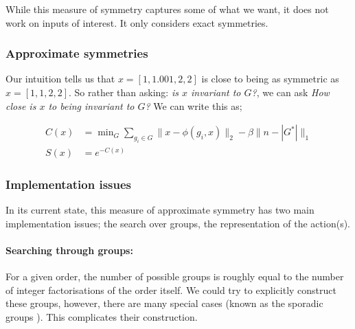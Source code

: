 While this measure of symmetry captures some of what we want, it does not work on inputs of interest.
It only considers exact symmetries.

\subsubsection{Approximate symmetries}

Our intuition tells us that $x = [1,1.001,2,2]$ is close to being as symmetric as
$x = [1,1,2,2]$. So rather than asking: \textit{is $x$ invariant to $G$?}, we can ask
\textit{How close is $x$ to being invariant to $G$?} We can write this as;


\begin{align*}
C(x) &= \mathop{\text{min}}_G \sum_{g_i\in G}\parallel x-\phi(g_i, x)\parallel_2 - \beta \parallel n-|G^{* }| \parallel_1 \label{eq:sym-measure}\\
S(x) &= e^{-C(x)}
\end{align*}


\subsubsection{Implementation issues}\label{implementation-issues}

In its current state, this measure of approximate symmetry has two main implementation issues;
the search over groups, the representation of the action(s).

\paragraph{Searching through groups:}\label{searching-through-groups} For a given order, the number of possible
groups is roughly equal to the number of integer factorisations of the order itself.
We could try to explicitly construct these groups, however, there are many special cases (known as the sporadic groups \cite{Conway1985}).
This complicates their construction\footnotemark.




